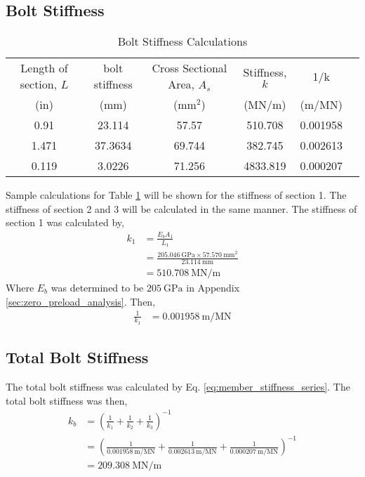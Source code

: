 \subsection{Bolt Stiffness}
\begin{table}[h]
    \centering
    \caption{Bolt Stiffness Calculations}
    \label{tab:bolt_stiffness}
    \begin{tabular}{cccccc}
    \toprule
    Length of section, $L$	& bolt stiffness	& Cross Sectional Area, $A_s$	& Stiffness, $k$	& 1/k \\
    (in)	& (mm)	& (mm$^2$)	& (MN/m)	& (m/MN) \\
    \midrule
    0.91	& 23.114	& 57.57 & 510.708 & 0.001958 \\
    1.471	& 37.3634	& 69.744 & 382.745 & 0.002613 \\
    0.119	& 3.0226	& 71.256 & 4833.819 & 0.000207 \\
    \bottomrule
    \end{tabular}
\end{table}
Sample calculations for Table \ref{tab:bolt_stiffness} will be shown for the stiffness of section 1. The stiffness of section 2 and 3 will be calculated in the same manner. The stiffness of section 1 was calculated by,
\begin{align*}
    k_1 &= \frac{E_b A_1}{L_1} \\
    &= \frac{\qty{205.046}{\giga\pascal} \times \qty{57.570}{\milli\meter\squared}}{\qty{23.114}{\milli\meter}} \\
    &= \qty{510.708}{\mega\newton\per\meter}
\end{align*}
Where $E_b$ was determined to be $\qty{205}{\giga\pascal}$ in Appendix \ref{sec:zero_preload_analysis}. Then,
\begin{align*}
    \frac{1}{k_1} &= \qty{0.001958}{\meter\per\mega\newton}
\end{align*}

\subsection{Total Bolt Stiffness}
The total bolt stiffness was calculated by Eq. \ref{eq:member_stiffness_series}. The total bolt stiffness was then,
\begin{align*}
    k_b &= \left(\frac{1}{k_1} + \frac{1}{k_2} + \frac{1}{k_3}\right)^{-1} \\
    &= \left(\frac{1}{\qty{0.001958}{\meter\per\mega\newton}} + \frac{1}{\qty{0.002613}{\meter\per\mega\newton}} + \frac{1}{\qty{0.000207}{\meter\per\mega\newton}}\right)^{-1} \\
    &= \boxed{\qty{209.308}{\mega\newton\per\meter}}
\end{align*}

